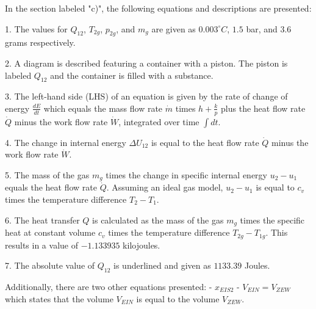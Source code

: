 In the section labeled "c)", the following equations and descriptions are presented:

1. The values for \(Q_{12}\), \(T_{2g}\), \(p_{2g}\), and \(m_g\) are given as \(0.003^\circ C\), \(1.5\) bar, and \(3.6\) grams respectively.

2. A diagram is described featuring a container with a piston. The piston is labeled \(Q_{12}\) and the container is filled with a substance.

3. The left-hand side (LHS) of an equation is given by the rate of change of energy \( \frac{dE}{dt} \) which equals the mass flow rate \( \dot{m} \) times \( h + \frac{k}{p} \) plus the heat flow rate \( \dot{Q} \) minus the work flow rate \( \dot{W} \), integrated over time \( \int dt \).

4. The change in internal energy \( \Delta U_{12} \) is equal to the heat flow rate \( \dot{Q} \) minus the work flow rate \( \dot{W} \).

5. The mass of the gas \( m_g \) times the change in specific internal energy \( u_2 - u_1 \) equals the heat flow rate \( \dot{Q} \). Assuming an ideal gas model, \( u_2 - u_1 \) is equal to \( c_v \) times the temperature difference \( T_2 - T_1 \).

6. The heat transfer \( Q \) is calculated as the mass of the gas \( m_g \) times the specific heat at constant volume \( c_v \) times the temperature difference \( T_{2g} - T_{1g} \). This results in a value of \(-1.133935\) kilojoules.

7. The absolute value of \( Q_{12} \) is underlined and given as \( 1133.39 \) Joules.

Additionally, there are two other equations presented:
- \( x_{EIS2} \)
- \( V_{EIN} = V_{ZEW} \) which states that the volume \( V_{EIN} \) is equal to the volume \( V_{ZEW} \).